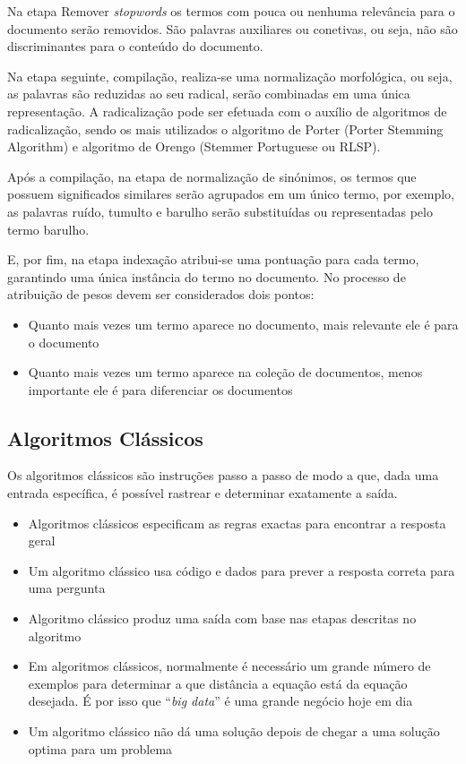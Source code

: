 \documentclass[a4paper,10pt]{article}
\begin{document}
Na etapa Remover \textit{stopwords} os termos com pouca ou nenhuma relevância para o documento serão removidos.
São palavras auxiliares ou conetivas, ou seja, não são discriminantes para o conteúdo do documento.\cite{oth3}

Na etapa seguinte, compilação, realiza-se uma normalização morfológica, ou seja, as palavras são reduzidas ao seu radical, serão combinadas em uma única representação. A radicalização pode ser efetuada com o auxílio de algoritmos de radicalização, sendo os mais utilizados o algoritmo de Porter (Porter Stemming Algorithm) e algoritmo de Orengo (Stemmer Portuguese ou RLSP).\cite{oth1}

Após a compilação, na etapa de normalização de sinónimos, os termos que possuem significados similares serão agrupados em um único termo, por exemplo, as palavras ruído, tumulto e barulho serão substituídas ou representadas pelo termo barulho.

E, por fim, na etapa indexação atribui-se uma pontuação para cada termo, garantindo uma única instância do termo no documento.
No processo de atribuição de pesos devem ser considerados dois pontos:
\begin{itemize}
  \item Quanto mais vezes um termo aparece no documento, mais relevante ele é para o documento
  \item Quanto mais vezes um termo aparece na coleção de documentos, menos importante ele é para diferenciar os documentos
\end{itemize}

\subsection{Algoritmos Clássicos}

Os algoritmos clássicos são instruções passo a passo de modo a que, dada uma entrada específica, é possível rastrear e determinar exatamente a saída.\cite{oth2}
\begin{itemize}
  \item Algoritmos clássicos especificam as regras exactas para encontrar a resposta geral
  \item Um algoritmo clássico usa código e dados para prever a resposta correta para uma pergunta
  \item Algoritmo clássico produz uma saída com base nas etapas descritas no algoritmo
  \item Em algoritmos clássicos, normalmente é necessário um grande número de exemplos para determinar a que distância a equação está da equação desejada. É por isso que ``\textit{big data}'' é uma grande negócio hoje em dia
  \item Um algoritmo clássico não dá uma solução depois de chegar a uma solução optima para um problema
\end{itemize}
\end{document}
